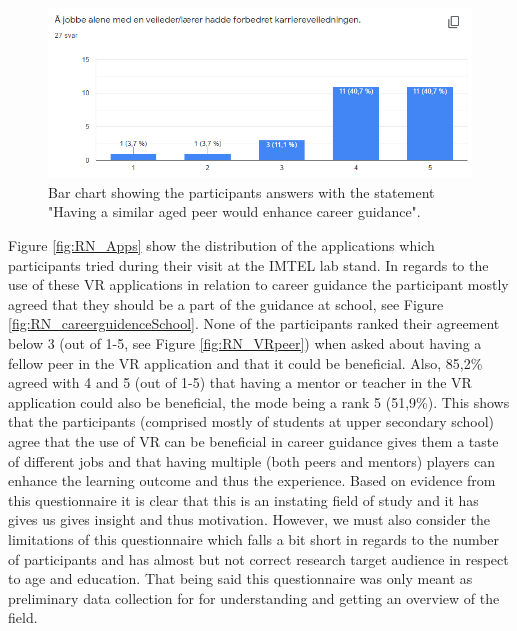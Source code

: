 \begin{figure}[!ht]
    \centering
    \captionsetup{width=.7\linewidth}
    \includegraphics[width=.8\textwidth]{./fig/phase_1/researcherNight/RN_careerguidenceMentor.PNG}
    \caption{Bar chart showing the participants answers with the statement "Having a similar aged peer would enhance career guidance".}
    \label{fig:phase1RNPeer}
\end{figure}

Figure \ref{fig:RN_Apps} show the distribution of the applications which participants tried during their visit at the IMTEL lab stand.  In regards to the use of these VR applications in relation to career guidance the participant mostly agreed that they should be a part of the guidance at school, see Figure \ref{fig:RN_careerguidenceSchool}. None of the participants ranked their agreement below 3 (out of 1-5, see Figure \ref{fig:RN_VRpeer}) when asked about having a fellow peer in the VR application and that it could be beneficial. Also, 85,2\% agreed with 4 and 5 (out of 1-5) that having a mentor or teacher in the VR application could also be beneficial, the mode being a rank 5 (51,9\%).
This shows that the participants (comprised mostly of students at upper secondary school) agree that the use of VR can be beneficial in career guidance gives them a taste of different jobs and that having multiple (both peers and mentors) players can enhance the learning outcome and thus the experience. Based on evidence from this questionnaire it is clear that this is an instating field of study and it has gives us gives insight and thus motivation. However, we must also consider the limitations of this questionnaire which falls a bit short in regards to the number of participants and has almost but not correct research target audience in respect to age and education. That being said this questionnaire was only meant as preliminary data collection for for understanding and getting an overview of the field.          

